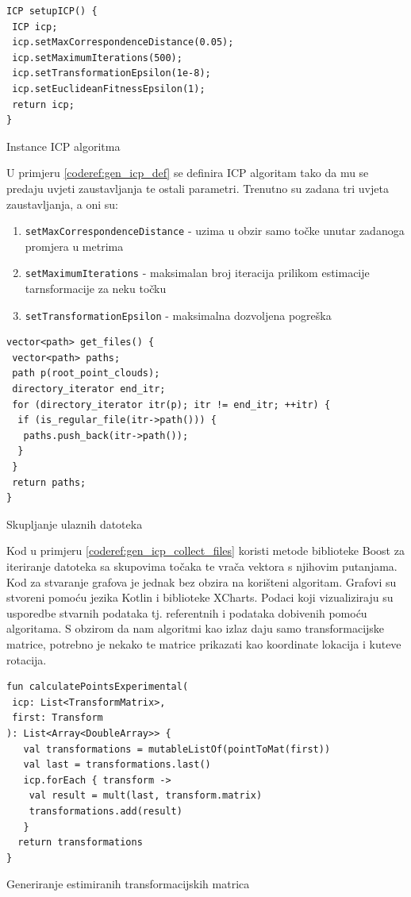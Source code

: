 \begin{listing}[h!]
  \begin{verbatim}
ICP setupICP() {
 ICP icp;
 icp.setMaxCorrespondenceDistance(0.05);
 icp.setMaximumIterations(500);
 icp.setTransformationEpsilon(1e-8);
 icp.setEuclideanFitnessEpsilon(1);
 return icp;
}
  \end{verbatim}
  \caption{Instance ICP algoritma}
  \label{coderef:gen_icp_def}
\end{listing}
\pagebreak
U primjeru \ref{coderef:gen_icp_def} se definira ICP algoritam tako da mu se predaju uvjeti zaustavljanja te ostali parametri. Trenutno su zadana tri uvjeta zaustavljanja, a oni su:

\begin{enumerate}
  \item \texttt{setMaxCorrespondenceDistance} - uzima u obzir samo točke unutar zadanoga promjera u metrima
  \item \texttt{setMaximumIterations} - maksimalan broj iteracija prilikom estimacije tarnsformacije za neku točku
  \item \texttt{setTransformationEpsilon} - maksimalna dozvoljena pogreška
\end{enumerate}

\begin{listing}[h!]
  \begin{verbatim}
vector<path> get_files() {
 vector<path> paths;
 path p(root_point_clouds);
 directory_iterator end_itr;
 for (directory_iterator itr(p); itr != end_itr; ++itr) {
  if (is_regular_file(itr->path())) {
   paths.push_back(itr->path());
  }
 }
 return paths;
}
  \end{verbatim}
  \caption{Skupljanje ulaznih datoteka}
  \label{coderef:gen_icp_collect_files}
\end{listing}
\pagebreak
Kod u primjeru \ref{coderef:gen_icp_collect_files} koristi metode biblioteke Boost\cite{boost} za iteriranje datoteka sa skupovima točaka te vrača vektora s njihovim putanjama. Kod za stvaranje grafova je jednak bez obzira na korišteni algoritam. Grafovi su stvoreni pomoću jezika Kotlin i biblioteke XCharts. Podaci koji vizualiziraju su usporedbe stvarnih podataka tj. referentnih i podataka dobivenih pomoću algoritama. S obzirom da nam algoritmi kao izlaz daju samo transformacijske matrice, potrebno je nekako te matrice prikazati kao koordinate lokacija i kuteve rotacija.

\begin{listing}[h!]
  \begin{verbatim}
fun calculatePointsExperimental(
 icp: List<TransformMatrix>,
 first: Transform
): List<Array<DoubleArray>> {
   val transformations = mutableListOf(pointToMat(first))
   val last = transformations.last()
   icp.forEach { transform ->
    val result = mult(last, transform.matrix)
    transformations.add(result)
   }
  return transformations
}
  \end{verbatim}
  \caption{Generiranje estimiranih transformacijskih matrica}
  \label{kotlin:gen_est_loc}
\end{listing}


